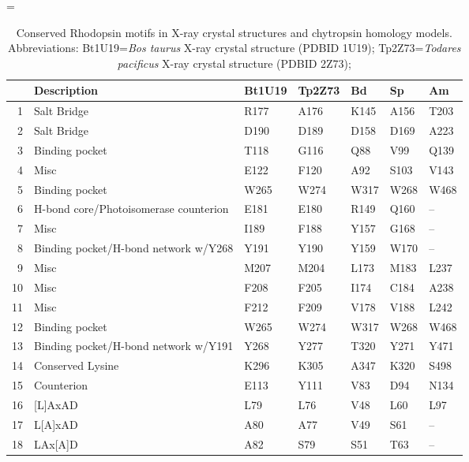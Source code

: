 \LTcapwidth=\textwidth
{\renewcommand{\arraystretch}{0.5}
{\setlength{\tabcolsep}{1pt}
\begin{longtable}{rllllll}
\caption[Locations of key residues in rhodopsin structural motifs]{Conserved Rhodopsin motifs in X-ray crystal structures and chytropsin homology models. Abbreviations: Bt1U19=\textit{Bos taurus} X-ray crystal structure (PDBID 1U19); Tp2Z73=\textit{Todares pacificus} X-ray crystal structure (PDBID 2Z73);} \label{tab:ChRhodS_residues} \\
  \hline
\hline
 & Description & Bt1U19 & Tp2Z73 & Bd & Sp & Am \\ 
  \hline
1 & Salt Bridge & R177 & A176 & K145 & A156 & T203 \\ 
  2 & Salt Bridge & D190 & D189 & D158 & D169 & A223 \\ 
   \hline
3 & Binding pocket & T118 & G116 & Q88 & V99 & Q139 \\ 
  4 & Misc & E122 & F120 & A92 & S103 & V143 \\ 
  5 & Binding pocket & W265 & W274 & W317 & W268 & W468 \\ 
  6 & H-bond core/Photoisomerase counterion & E181 & E180 & R149 & Q160 & -- \\ 
  7 & Misc & I189 & F188 & Y157 & G168 & -- \\ 
  8 & Binding pocket/H-bond network w/Y268 & Y191 & Y190 & Y159 & W170 & -- \\ 
  9 & Misc & M207 & M204 & L173 & M183 & L237 \\ 
  10 & Misc & F208 & F205 & I174 & C184 & A238 \\ 
  11 & Misc & F212 & F209 & V178 & V188 & L242 \\ 
  12 & Binding pocket & W265 & W274 & W317 & W268 & W468 \\ 
  13 & Binding pocket/H-bond network w/Y191 & Y268 & Y277 & T320 & Y271 & Y471 \\ 
   \hline
14 & Conserved Lysine & K296 & K305 & A347 & K320 & S498 \\ 
  15 & Counterion & E113 & Y111 & V83 & D94 & N134 \\ 
   \hline
16 & [L]AxAD & L79 & L76 & V48 & L60 & L97 \\ 
  17 & L[A]xAD & A80 & A77 & V49 & S61 & -- \\ 
  18 & LAx[A]D & A82 & S79 & S51 & T63 & -- \\ 

\end{longtable}}}
